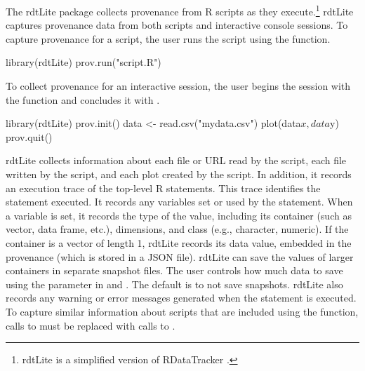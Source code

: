 The rdtLite package collects provenance from R scripts as they execute.\footnote{rdtLite is a simplified version of RDataTracker \citep{Lerner:TAPP14, Lerner:Informatics}.}
rdtLite captures provenance data from both scripts and interactive console sessions. To capture provenance for a script, the user runs the script using the  function.

\begin{example}
library(rdtLite)
prov.run("script.R")
\end{example}
To collect provenance for an interactive session, the user begins the session with the  function and concludes it with . 
\begin{example}
library(rdtLite)
prov.init()
data <- read.csv("mydata.csv")
plot(data$x, data$y)
prov.quit()
\end{example}

%

%

rdtLite collects information about each file or URL read by the script, each file written by the script, and each plot created by the script.  In addition, it records an execution trace of the top-level R statements.  This trace identifies the statement executed.  It records any variables set or used by the statement.  When a variable is set, it records the type of the value, including its container (such as vector, data frame, etc.), dimensions, and class (e.g., character, numeric).  If the container is a vector of length 1, rdtLite records its  data value, embedded in the provenance (which is stored in a JSON file).  rdtLite can save the values of larger containers in separate snapshot files.  The user controls how much data to save using the  parameter in  and .  The default is to not save snapshots. rdtLite also records any warning or error messages generated when the statement is executed.  To capture similar information about scripts that are included using the  function, calls to  must be replaced with calls to .

